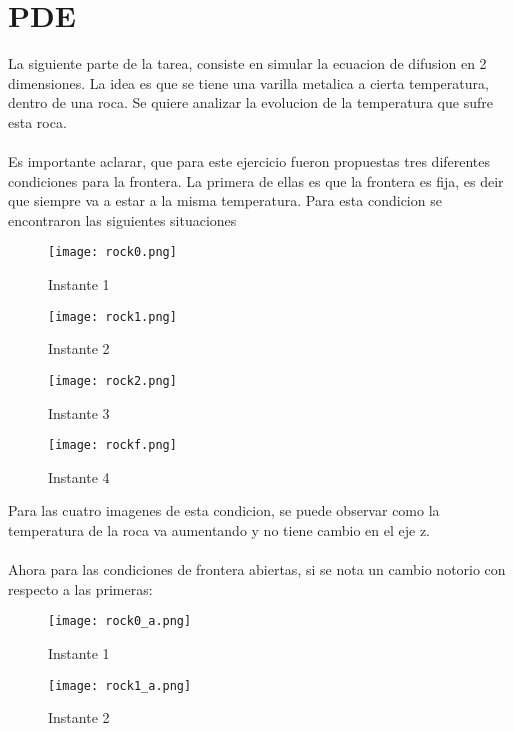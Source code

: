 \documentclass{article}[11]
\begin{document}
\section{PDE }
La siguiente parte de la tarea, consiste en simular la ecuacion de difusion en 2 dimensiones. La idea es que se tiene una varilla metalica a cierta temperatura, dentro de una roca. Se quiere analizar la evolucion de la temperatura que sufre esta roca.
\\
\\
Es importante aclarar, que para este ejercicio fueron propuestas tres diferentes condiciones para la frontera. La primera de ellas es que la frontera es fija, es deir que siempre va a estar a la misma temperatura. Para esta condicion se encontraron las siguientes situaciones

\begin{figure}
    \centering
    \texttt{[image: rock0.png]}
    \caption{Instante 1}
    \label{fig:my_label}
\end{figure}

\begin{figure}
    \centering
    \texttt{[image: rock1.png]}
    \caption{Instante 2}
    \label{fig:my_label}
\end{figure}

\begin{figure}
    \centering
    \texttt{[image: rock2.png]}
    \caption{Instante 3}
    \label{fig:my_label}
\end{figure}

\begin{figure}
    \centering
    \texttt{[image: rockf.png]}
    \caption{Instante 4}
    \label{fig:my_label}
\end{figure}

Para las cuatro imagenes de esta condicion, se puede observar como la temperatura de la roca va aumentando y no tiene cambio en el eje z.
\\
\\
Ahora para las condiciones de frontera abiertas, si se nota un cambio notorio con respecto a las primeras:
\begin{figure}
    \centering
    \texttt{[image: rock0\_a.png]}
    \caption{Instante 1}
    \label{fig:my_label}
\end{figure}

\begin{figure}
    \centering
    \texttt{[image: rock1\_a.png]}
    \caption{Instante 2}
    \label{fig:my_label}
\end{figure}
\end{document}
